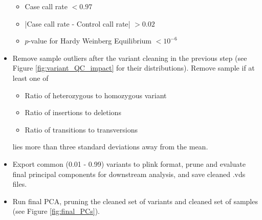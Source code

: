 \documentclass[12pt]{article}
\begin{document}
\begin{itemize}
\begin{itemize}
		\item Case call rate $< 0.97$
		\item |Case call rate - Control call rate| $> 0.02$
		\item $p$-value for Hardy Weinberg Equilibrium $< 10^{-6}$
	\end{itemize}
	\item Remove sample outliers after the variant cleaning in the previous step (see Figure \ref{fig:variant_QC_impact} for their distributions). Remove sample if at least one of
	\begin{itemize}
		\item Ratio of heterozygous to homozygous variant
		\item Ratio of insertions to deletions
		\item Ratio of transitions to transversions
	\end{itemize} 
	lies more than three standard deviations away from the mean.
	\item Export common (0.01 - 0.99) variants to plink format, prune and evaluate final principal components for downstream analysis, and save cleaned .vds files.
	\item Run final PCA, pruning the cleaned set of variants and cleaned set of samples (see Figure \ref{fig:final_PCs}).
\end{itemize}
\end{document}
